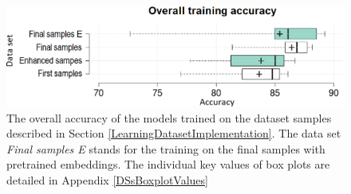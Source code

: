  \begin{figure}[t]
    \includegraphics[width =\textwidth]{Images/DSsBoxplot.png}
    \caption{The overall accuracy of the models trained on the dataset samples described in Section \ref{LearningDatasetImplementation}. The data set \textit{Final samples E} stands for the training on the final samples with pretrained embeddings. The individual key values of box plots are detailed in Appendix \ref{DSsBoxplotValues} }
    \label{DSsBoxplot}
\end{figure}

